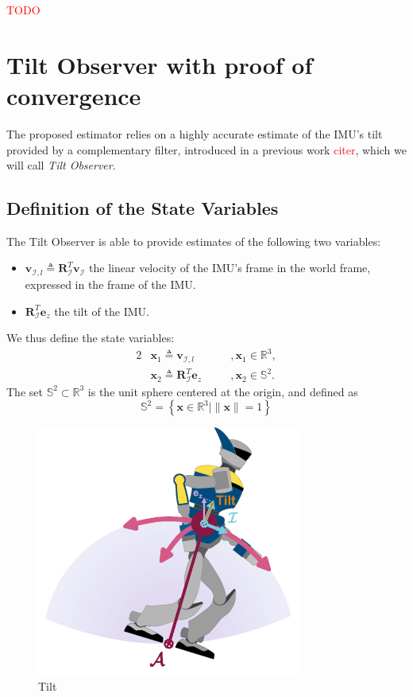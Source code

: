 \documentclass{IJCAS}
\begin{document}
\textcolor{red}{TODO}

\section{Tilt Observer with proof of convergence}
The proposed estimator relies on a highly accurate estimate of the IMU's tilt provided by a complementary filter, introduced in a previous work \textcolor{red}{citer}, which we will call \emph{Tilt Observer}. 

\subsection{Definition of the State Variables}
The Tilt Observer is able to provide estimates of the following two variables: 
\begin{itemize}
    \item $\boldsymbol{v}_{\mathcal{I}, l} \triangleq \boldsymbol{R}^{T}_{\mathcal{I}} \boldsymbol{v}_{\mathcal{I}} $ the linear velocity of the IMU's frame in the world frame, expressed in the frame of the IMU.
    \item $\boldsymbol{R}^{T}_{\mathcal{I}} \boldsymbol{e}_z$ the tilt of the IMU.
\end{itemize}
We thus define the state variables: 
\begin{alignat}{2}
&\boldsymbol{x}_{1} \triangleq \boldsymbol{v}_{\mathcal{I}, l} \quad &&, \boldsymbol{x}_{1} \in \mathbb{R}^{3}, \label{eq:x1} \\
&\boldsymbol{x}_{2} \triangleq \boldsymbol{R}^{T}_{\mathcal{I}} \boldsymbol{e}_z \quad &&, \boldsymbol{x}_{2} \in \mathbb{S}^{2}. \label{eq:x2}
\end{alignat} 
The set $\mathbb{S}^{2} \subset \mathbb{R}^{3}$ is the unit sphere centered at the origin, and defined as
\begin{equation}
    \mathbb{S}^{2} = \left\{ \boldsymbol{x} \in \mathbb{R}^{3} \vert \lVert \boldsymbol{x} \rVert=1 \right\}
\end{equation}

\begin{figure}[!t]
\begin{center}
\includegraphics[width=0.5\columnwidth]{Uploaded/Images/tilt.pdf} 
\vskip -0.5pc
\caption{Tilt}\label{fig:tilt}
\end{center}
\vskip -1.5pc
\end{figure}
\end{document}
